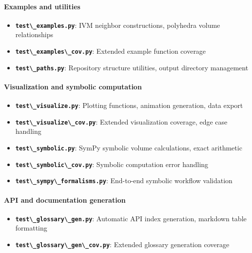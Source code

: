 \documentclass[
  10pt,
]{article}
\newcommand{\passthrough}[1]{#1}
\providecommand{\tightlist}{%
  \setlength{\itemsep}{0pt}\setlength{\parskip}{0pt}}
\begin{document}
\hypertarget{examples-and-utilities}{%
\paragraph{Examples and utilities}\label{examples-and-utilities}}

\begin{itemize}
\tightlist
\item
  \textbf{\passthrough{\lstinline!test\_examples.py!}}: IVM neighbor
  constructions, polyhedra volume relationships
\item
  \textbf{\passthrough{\lstinline!test\_examples\_cov.py!}}: Extended
  example function coverage
\item
  \textbf{\passthrough{\lstinline!test\_paths.py!}}: Repository
  structure utilities, output directory management
\end{itemize}

\hypertarget{visualization-and-symbolic-computation}{%
\paragraph{Visualization and symbolic
computation}\label{visualization-and-symbolic-computation}}

\begin{itemize}
\tightlist
\item
  \textbf{\passthrough{\lstinline!test\_visualize.py!}}: Plotting
  functions, animation generation, data export
\item
  \textbf{\passthrough{\lstinline!test\_visualize\_cov.py!}}: Extended
  visualization coverage, edge case handling
\item
  \textbf{\passthrough{\lstinline!test\_symbolic.py!}}: SymPy symbolic
  volume calculations, exact arithmetic
\item
  \textbf{\passthrough{\lstinline!test\_symbolic\_cov.py!}}: Symbolic
  computation error handling
\item
  \textbf{\passthrough{\lstinline!test\_sympy\_formalisms.py!}}:
  End-to-end symbolic workflow validation
\end{itemize}

\hypertarget{api-and-documentation-generation}{%
\paragraph{API and documentation
generation}\label{api-and-documentation-generation}}

\begin{itemize}
\tightlist
\item
  \textbf{\passthrough{\lstinline!test\_glossary\_gen.py!}}: Automatic
  API index generation, markdown table formatting
\item
  \textbf{\passthrough{\lstinline!test\_glossary\_gen\_cov.py!}}:
  Extended glossary generation coverage
\end{itemize}
\end{document}
